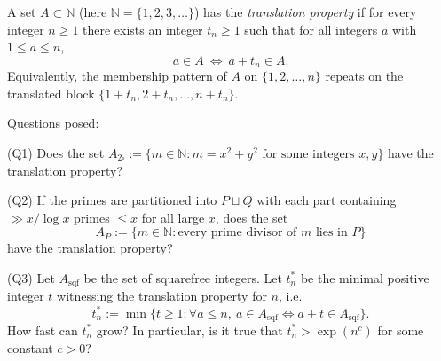 A set $A\subset\mathbb N$ (here $\mathbb N=\{1,2,3,\dots\}$) has the \emph{translation property} if for every integer $n\ge 1$ there exists an integer $t_n\ge 1$ such that for all integers $a$ with $1\le a\le n$,
\[
 a\in A\ \Longleftrightarrow\ a+t_n\in A.
\]
Equivalently, the membership pattern of $A$ on $\{1,2,\dots,n\}$ repeats on the translated block $\{1+t_n,2+t_n,\dots,n+t_n\}$.

Questions posed:

(Q1) Does the set $A_{2\square}:=\{m\in\mathbb N: m=x^2+y^2\text{ for some integers }x,y\}$ have the translation property?

(Q2) If the primes are partitioned into $P\sqcup Q$ with each part containing $\gg x/\log x$ primes $\le x$ for all large $x$, does the set
\[
A_P:=\{m\in\mathbb N: \text{every prime divisor of }m\text{ lies in }P\}
\]
have the translation property?

(Q3) Let $A_{\mathrm{sqf}}$ be the set of squarefree integers. Let $t_n^*$ be the minimal positive integer $t$ witnessing the translation property for $n$, i.e.
\[
 t_n^*:=\min\{t\ge 1: \forall a\le n,\ a\in A_{\mathrm{sqf}}\iff a+t\in A_{\mathrm{sqf}}\}.
\]
How fast can $t_n^*$ grow? In particular, is it true that $t_n^*>\exp(n^c)$ for some constant $c>0$?
